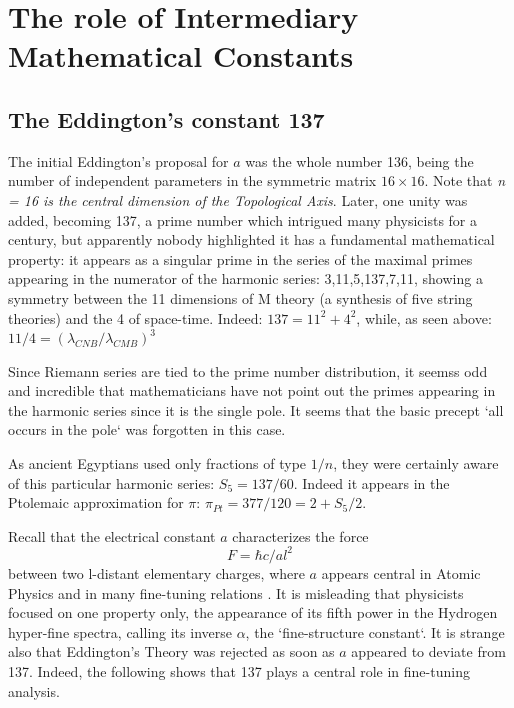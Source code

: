 \documentclass[twoside,draft]{article}
\begin{document}
\begin{sloppypar}
\section{The role of Intermediary Mathematical Constants}

\subsection{The Eddington's constant 137}

The initial Eddington's proposal for $a$ was the whole number 136, being the number of independent parameters in the symmetric matrix $16 \times 16$. Note that \textit{n = 16 is the central dimension of the Topological Axis}. Later, one unity was added, becoming 137, a prime number which intrigued many physicists for a century, but apparently nobody highlighted it has a fundamental mathematical property: it appears as a singular prime in the series of the maximal primes appearing in the numerator of the harmonic
series: 3,11,5,137,7,11, showing a symmetry between the 11 dimensions of M theory (a synthesis of five string theories) and the 4 of space-time. Indeed: $137 = 11^{2} + 4^{2}$, while, as seen above: $11/4 = (\lambda_{CNB}/\lambda_{CMB})^{3}$

Since Riemann series are tied to the prime number distribution, it seemss odd and incredible that mathematicians
have not point out the primes appearing in the harmonic series since it is the single pole. It seems
that the basic precept `all occurs in the pole` was forgotten in this case. 

As ancient Egyptians used only fractions of type $1/n$, they were certainly aware of this particular harmonic series: 
$S_{5} = 137/60$. Indeed it appears in the Ptolemaic approximation for $\pi$: $\pi_{Pt} = 377/120 = 2 +  S_{5}/2$.

Recall that the electrical constant $a$ characterizes the force $$F =\hbar c/al^{2}$$ between two l-distant
elementary charges, where $a$ appears central in Atomic Physics and in many fine-tuning relations \cite{Carr}. It is
misleading that physicists focused on one property only, the appearance of its fifth power in the
Hydrogen hyper-fine spectra, calling its inverse $\alpha$, the `fine-structure constant`. It is strange also that
Eddington's Theory was rejected as soon as $a$ appeared to deviate from 137. Indeed, the
following shows that 137 plays a central role in fine-tuning analysis. 


\end{sloppypar}
\end{document}
